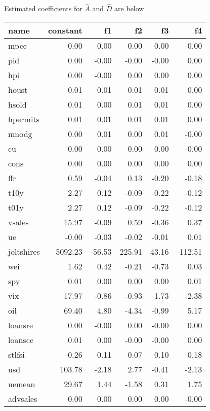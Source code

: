 \documentclass[11pt, letterpaper]{article}\usepackage[]{graphicx}\usepackage[]{color}
\begin{document}
Estimated coefficients for $\widehat{A}$ and $\widehat{D}$ are below.
\begin{table}[H]
\centering
\begingroup\footnotesize
\begin{tabular}{lrrrrr}
  \hline
name & constant & f1 & f2 & f3 & f4 \\ 
  \hline
mpce & 0.00 & 0.00 & 0.00 & 0.00 & -0.00 \\ 
  pid & 0.00 & -0.00 & -0.00 & -0.00 & 0.00 \\ 
  hpi & 0.00 & -0.00 & 0.00 & 0.00 & 0.00 \\ 
  houst & 0.01 & 0.01 & 0.01 & 0.01 & 0.00 \\ 
  hsold & 0.01 & 0.00 & 0.01 & 0.01 & 0.00 \\ 
  hpermits & 0.01 & 0.01 & 0.01 & 0.01 & 0.00 \\ 
  mnodg & 0.00 & 0.01 & 0.00 & 0.01 & -0.00 \\ 
  cu & 0.00 & 0.00 & 0.00 & 0.00 & -0.00 \\ 
  cons & 0.00 & 0.00 & 0.00 & 0.00 & 0.00 \\ 
  ffr & 0.59 & -0.04 & 0.13 & -0.20 & -0.18 \\ 
  t10y & 2.27 & 0.12 & -0.09 & -0.22 & -0.12 \\ 
  t01y & 2.27 & 0.12 & -0.09 & -0.22 & -0.12 \\ 
  vsales & 15.97 & -0.09 & 0.59 & -0.36 & 0.37 \\ 
  ue & -0.00 & -0.03 & -0.02 & -0.01 & 0.01 \\ 
  joltshires & 5092.23 & -56.53 & 225.91 & 43.16 & -112.51 \\ 
  wei & 1.62 & 0.42 & -0.21 & -0.73 & 0.03 \\ 
  spy & 0.01 & 0.00 & 0.00 & 0.00 & 0.01 \\ 
  vix & 17.97 & -0.86 & -0.93 & 1.73 & -2.38 \\ 
  oil & 69.40 & 4.80 & -4.34 & -0.99 & 5.17 \\ 
  loansre & 0.00 & -0.00 & 0.00 & -0.00 & 0.00 \\ 
  loanscc & 0.01 & 0.00 & -0.00 & -0.00 & 0.00 \\ 
  stlfsi & -0.26 & -0.11 & -0.07 & 0.10 & -0.18 \\ 
  usd & 103.78 & -2.18 & 2.77 & -0.41 & -2.13 \\ 
  uemean & 29.67 & 1.44 & -1.58 & 0.31 & 1.75 \\ 
  advsales & 0.00 & 0.00 & 0.00 & 0.00 & -0.00 \\ 

\end{tabular}
\end{table}
\end{document}
